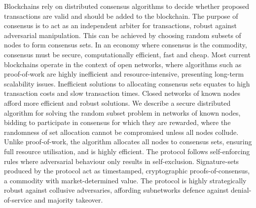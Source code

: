 Blockchains rely on distributed consensus algorithms to decide whether proposed transactions are valid and should be added to the blockchain. The purpose of consensus is to act as an independent arbiter for transactions, robust against adversarial manipulation. This can be achieved by choosing random subsets of nodes to form consensus sets. In an economy where consensus is the commodity, consensus must be secure, computationally efficient, fast and cheap. Most current blockchains operate in the context of open networks, where algorithms such as proof-of-work are highly inefficient and resource-intensive, presenting long-term scalability issues. Inefficient solutions to allocating consensus sets equates to high transaction costs and slow transaction times. Closed networks of known nodes afford more efficient and robust solutions. We describe a secure distributed algorithm for solving the random subset problem in networks of known nodes, bidding to participate in consensus for which they are rewarded, where the randomness of set allocation cannot be compromised unless all nodes collude. Unlike proof-of-work, the algorithm allocates all nodes to consensus sets, ensuring full resource utilisation, and is highly efficient. The protocol follows self-enforcing rules where adversarial behaviour only results in self-exclusion. Signature-sets produced by the protocol act as timestamped, cryptographic proofs-of-consensus, a commodity with market-determined value. The protocol is highly strategically robust against collusive adversaries, affording subnetworks defence against denial-of-service and majority takeover.
